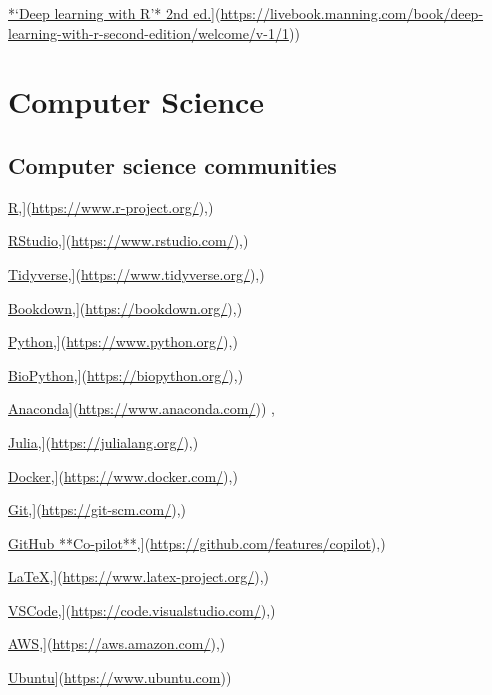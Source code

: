 \documentclass[
]{book}
\begin{document}
\href{\%5Bhttps://livebook.manning.com/book/deep-learning-with-r-second-edition/welcome/v-1/1}{*`Deep learning with R'* 2nd ed.}{]}(\url{https://livebook.manning.com/book/deep-learning-with-r-second-edition/welcome/v-1/1}))

\chapter{Computer Science}\label{computer-science}

\section{Computer science communities}\label{computer-science-communities}

\href{\%5Bhttps://www.r-project.org/}{R},{]}(\url{https://www.r-project.org/}),)

\href{\%5Bhttps://www.rstudio.com/}{RStudio},{]}(\url{https://www.rstudio.com/}),)

\href{\%5Bhttps://www.tidyverse.org/}{Tidyverse},{]}(\url{https://www.tidyverse.org/}),)

\href{\%5Bhttps://bookdown.org/}{Bookdown},{]}(\url{https://bookdown.org/}),)

\href{\%5Bhttps://www.python.org/}{Python},{]}(\url{https://www.python.org/}),)

\href{\%5Bhttps://biopython.org/}{BioPython},{]}(\url{https://biopython.org/}),)

\href{\%5Bhttps://www.anaconda.com/}{Anaconda}{]}(\url{https://www.anaconda.com/})) ,

\href{\%5Bhttps://julialang.org/}{Julia},{]}(\url{https://julialang.org/}),)

\href{\%5Bhttps://www.docker.com/}{Docker},{]}(\url{https://www.docker.com/}),)

\href{\%5Bhttps://git-scm.com/}{Git},{]}(\url{https://git-scm.com/}),)

\href{\%5Bhttps://github.com/features/copilot}{GitHub **Co-pilot**},{]}(\url{https://github.com/features/copilot}),)

\href{\%5Bhttps://www.latex-project.org/}{LaTeX},{]}(\url{https://www.latex-project.org/}),)

\href{\%5Bhttps://code.visualstudio.com/}{VSCode},{]}(\url{https://code.visualstudio.com/}),)

\href{\%5Bhttps://aws.amazon.com/}{AWS},{]}(\url{https://aws.amazon.com/}),)

\href{\%5Bhttps://www.ubuntu.com}{Ubuntu}{]}(\url{https://www.ubuntu.com}))
\end{document}
